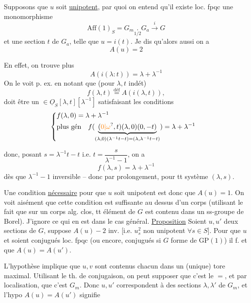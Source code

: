  Supposons que $u$ soit \uline{unipotent}, par quoi on entend qu'il existe loc. fpqc une 
monomorphisme
\[
\mathrm{Aff}(1)_S=G_m\underset{1/2}{\boldsymbol{.}}G_a\xrightarrow{i}G
\]
et une section $t$ de $G_a$, telle que $u=i(t)$. Je dis qu'alors aussi on a
\[
A(u)=2
\]

En effet, on trouve plus  
\[
A(i(\lambda:t))=\lambda+\lambda^{-1}
\]
On le voit p. ex. en notant que (pour $\lambda,t$ indét)
\[
f(\lambda,t)\overset{\text{déf}}{=}A(i(\lambda,t)),
\]
doit être un $\in\underline O_S[\lambda,t][\lambda^{-1}]$ satisfaisant les conditions
\[
\begin{aligned}
&\left\{\begin{aligned}
&f(\lambda,0)=\lambda+\lambda^{-1}\\
&\text{plus gén}\quad f(\underbrace{(\unsure{0|\omega},t)(\lambda,0)(0,-t)}_{(\lambda,0)(\lambda^{-1}t-t)=(\lambda,\lambda^{-1}t-t)})=\lambda+\lambda^{-1}
\end{aligned}\right.
\end{aligned}
\]

donc, posant $s=\lambda^{-1}t-t$ i.e. $t=\dfrac{s}{\lambda^{-1}-1}$, on a
\[
f(\lambda,s)=\lambda+\lambda^{-1}
\]
dès que $\lambda^{-1}-1$ inversible -- donc par prolongement, pour tt système $(\lambda,s)$.

Une condition \uline{nécessaire} pour que $u$ soit unipotent est donc que $A(u)=1$. On voit aisément que cette condition est suffisante au dessus d'un corps (utilisant le fait que sur un corps alg. clos, tt élément de $G$ est contenu dans un ss-groupe de Borel). J'ignore ce qui en est dans le cas général.
\uline{Proposition} Soient $u,u'$ deux sections de $G$,   suppose $A(u)-2$  inv. [i.e. $u_s^2$ non unipotent $\forall s\in S$]. Pour que $u$ et  soient conjugués loc. fpqc (ou encore, conjugués si $G$ forme de $\mathrm{GP}(1)$) il f. et  que $A(u)=A(u')$.

  L'hypothèse  implique que $u,v$ sont contenus chacun dans un (unique) tore maximal. Utilisant le th. de conjugaison, on peut supposer que c'est le $=$, et par localisation, que c'est $G_m$. Donc $u,u'$ correspondent à des sections $\lambda,\lambda'$ de $G_m$, et l'hypo $A(u)=A(u')$ signifie

